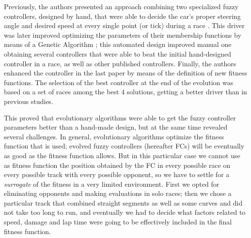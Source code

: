 \documentclass[10pt,journal,compsoc]{IEEEtran}
\begin{document}
Previously, the authors presented an approach combining two specialized fuzzy controllers, designed by hand, that were able to decide the car's proper steering angle and desired speed at every single point (or tick) during a race \cite{salem_evo17}. This driver was later improved \cite{salem_evo18} optimizing the parameters of their membership functions by means of a Genetic Algorithm
\cite{GAs_Goldberg89}; this automated design improved manual one
obtaining several controllers that were able to beat the initial
hand-designed controller in a race, as well as other published
controllers. Finally, the authors enhanced the controller in the last paper \cite{salem_cig2018} by means of the definition of new fitness functions. The selection of the best controller at the end of the evolution was based on a set of races among the best 4 solutions, getting a better driver than in previous studies.

This proved that evolutionary algorithms were able to get the fuzzy
controller parameters better than a hand-made design, but at the same
time revealed several challenges. In general, evolutionary algorithms
optimize the fitness function that is used; evolved fuzzy controllers
(hereafter FCs) will be eventually as good as the fitness function allows. 
But in this particular case we cannot use as fitness function the position
obtained by the FC in every possible race on every possible track with
every possible opponent, so we have to settle for a {\em surrogate} of
the fitness in a very limited environment. First we opted for
eliminating opponents and making evaluations in solo races; then we
chose a particular track that combined straight segments as well as
some curves and did not take too long to run, and eventually we had to
decide what factors related to speed, damage and lap time were going
to be effectively included in the final fitness function. 

\end{document}
